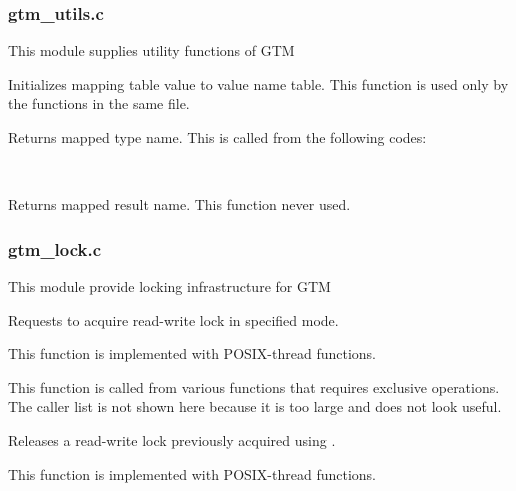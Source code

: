 
\subsubsection{gtm\_utils.c}

  This module supplies utility functions of GTM


	Initializes mapping table value to value name table.
	This function is used only by the functions in the same file.


	Returns mapped type name. 
	This is called from the following codes:

	\FuncRefHdr
	  \\ \hline
	\FuncRefTrailor


	Returns mapped result name.
	This function never used.




\subsubsection{gtm\_lock.c}

  This module provide locking infrastructure for GTM



	Requests to acquire read-write lock in specified mode.

	This function is implemented with POSIX-thread functions.

	This function is called from various functions that requires exclusive operations.
	The caller list is not shown here because it is too large and does not look useful.


	Releases a read-write lock previously acquired using .

	This function is implemented with POSIX-thread functions.

